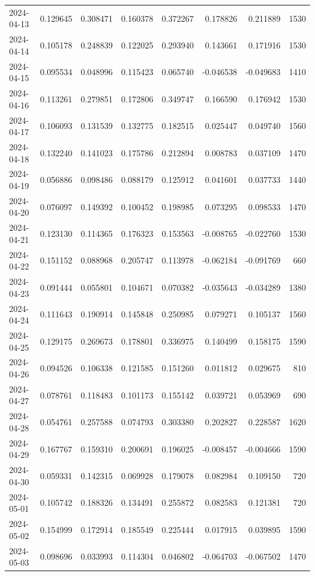 \begin{tabular}{lrrrrrrr}
2024-04-13 & 0.129645 & 0.308471 & 0.160378 & 0.372267 & 0.178826 & 0.211889 & 1530 \\
2024-04-14 & 0.105178 & 0.248839 & 0.122025 & 0.293940 & 0.143661 & 0.171916 & 1530 \\
2024-04-15 & 0.095534 & 0.048996 & 0.115423 & 0.065740 & -0.046538 & -0.049683 & 1410 \\
2024-04-16 & 0.113261 & 0.279851 & 0.172806 & 0.349747 & 0.166590 & 0.176942 & 1530 \\
2024-04-17 & 0.106093 & 0.131539 & 0.132775 & 0.182515 & 0.025447 & 0.049740 & 1560 \\
2024-04-18 & 0.132240 & 0.141023 & 0.175786 & 0.212894 & 0.008783 & 0.037109 & 1470 \\
2024-04-19 & 0.056886 & 0.098486 & 0.088179 & 0.125912 & 0.041601 & 0.037733 & 1440 \\
2024-04-20 & 0.076097 & 0.149392 & 0.100452 & 0.198985 & 0.073295 & 0.098533 & 1470 \\
2024-04-21 & 0.123130 & 0.114365 & 0.176323 & 0.153563 & -0.008765 & -0.022760 & 1530 \\
2024-04-22 & 0.151152 & 0.088968 & 0.205747 & 0.113978 & -0.062184 & -0.091769 & 660 \\
2024-04-23 & 0.091444 & 0.055801 & 0.104671 & 0.070382 & -0.035643 & -0.034289 & 1380 \\
2024-04-24 & 0.111643 & 0.190914 & 0.145848 & 0.250985 & 0.079271 & 0.105137 & 1560 \\
2024-04-25 & 0.129175 & 0.269673 & 0.178801 & 0.336975 & 0.140499 & 0.158175 & 1590 \\
2024-04-26 & 0.094526 & 0.106338 & 0.121585 & 0.151260 & 0.011812 & 0.029675 & 810 \\
2024-04-27 & 0.078761 & 0.118483 & 0.101173 & 0.155142 & 0.039721 & 0.053969 & 690 \\
2024-04-28 & 0.054761 & 0.257588 & 0.074793 & 0.303380 & 0.202827 & 0.228587 & 1620 \\
2024-04-29 & 0.167767 & 0.159310 & 0.200691 & 0.196025 & -0.008457 & -0.004666 & 1590 \\
2024-04-30 & 0.059331 & 0.142315 & 0.069928 & 0.179078 & 0.082984 & 0.109150 & 720 \\
2024-05-01 & 0.105742 & 0.188326 & 0.134491 & 0.255872 & 0.082583 & 0.121381 & 720 \\
2024-05-02 & 0.154999 & 0.172914 & 0.185549 & 0.225444 & 0.017915 & 0.039895 & 1590 \\
2024-05-03 & 0.098696 & 0.033993 & 0.114304 & 0.046802 & -0.064703 & -0.067502 & 1470 \\

\end{tabular}
